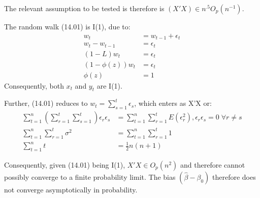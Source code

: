 \documentclass[]{article}
\begin{document}
The relevant assumption to be tested is therefore is $(X'X) \in n^{.5} O_p(n^{-1})$.

The random walk (14.01) is I(1), due to: \begin{align*}
	w_t &= w_{t-1}+\epsilon_t \\
	w_t - w_{t-1} &= \epsilon_t \\
	(1-L)w_t  &= \epsilon_t \\
	(1-\phi(z))w_t &= \epsilon_t \\
	\phi(z) &= 1
\end{align*} Consequently, both $x_t$ and $y_t$ are I(1).

Further, (14.01) reduces to $w_t = \sum^t_{s=1}{\epsilon_s}$, which enters as X'X or: \begin{align*}
	\sum_{t=1}^n \left( \sum_{r=1}^t \sum_{s=1}^t \right) \epsilon_r \epsilon_s &= \sum_{t=1}^n \sum_{r=1}^t E(\epsilon_r^2), \epsilon_r\epsilon_s=0 \;\forall r \ne s\\
	\sum_{t=1}^n \sum_{r=1}^t \sigma^2 &= \sum_{t=1}^n \sum_{r=1}^t 1 \\
	\sum_{t=1}^n t  &= \frac{1}{2}n(n+1)
\end{align*}

Consequently, given (14.01) being I(1), $X'X \in O_p(n^2)$ and therefore cannot possibly converge to a finite probability limit. The bias $(\hat{\beta} - \beta_0)$ therefore does not converge asymptotically in probability.
\end{document}
